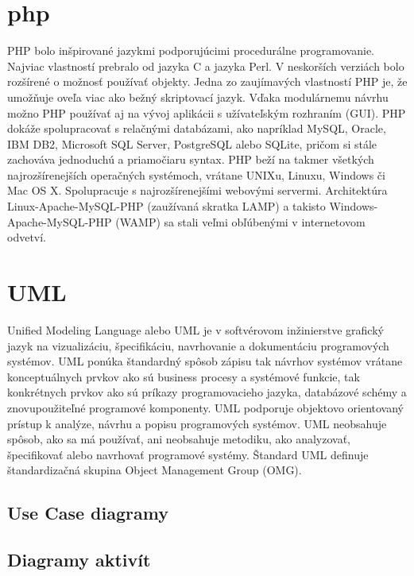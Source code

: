 \section{php}
PHP bolo inšpirované jazykmi podporujúcimi procedurálne programovanie. Najviac vlastností prebralo od jazyka C a jazyka Perl. V neskorších verziách bolo rozšírené o možnosť používať objekty. Jedna zo zaujímavých vlastností PHP je, že umožňuje oveľa viac ako bežný skriptovací jazyk. Vďaka modulárnemu návrhu možno PHP používať aj na vývoj aplikácii s užívateľským rozhraním (GUI). PHP dokáže spolupracovať s relačnými databázami, ako napríklad MySQL, Oracle, IBM DB2, Microsoft SQL Server, PostgreSQL alebo SQLite, pričom si stále zachováva jednoduchú a priamočiaru syntax. PHP beží na takmer všetkých najrozšírenejších operačných systémoch, vrátane UNIXu, Linuxu, Windows či Mac OS X. Spolupracuje s najrozšírenejšími webovými servermi. Architektúra Linux-Apache-MySQL-PHP (zaužívaná skratka LAMP) a takisto Windows-Apache-MySQL-PHP (WAMP) sa stali veľmi obľúbenými v internetovom odvetví.
\section{\acl{UML}}
Unified Modeling Language alebo UML je v softvérovom inžinierstve grafický jazyk na vizualizáciu, špecifikáciu, navrhovanie a dokumentáciu programových systémov. UML ponúka štandardný spôsob zápisu tak návrhov systémov vrátane konceptuálnych prvkov ako sú business procesy a systémové funkcie, tak konkrétnych prvkov ako sú príkazy programovacieho jazyka, databázové schémy a znovupoužiteľné programové komponenty. UML podporuje objektovo orientovaný prístup k analýze, návrhu a popisu programových systémov. UML neobsahuje spôsob, ako sa má používať, ani neobsahuje metodiku, ako analyzovať, špecifikovať alebo navrhovať programové systémy. Štandard UML definuje štandardizačná skupina Object Management Group (OMG).
\subsection{Use Case diagramy}
\subsection{Diagramy aktivít}


